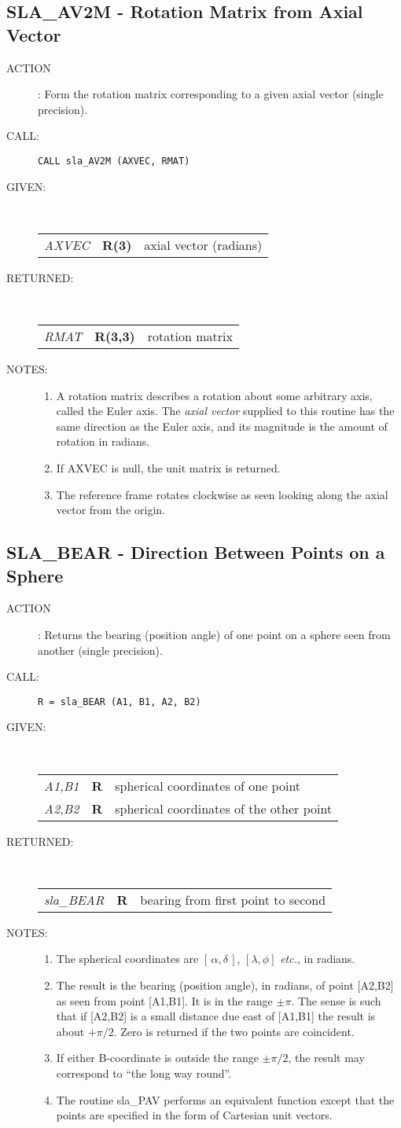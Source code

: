 \documentclass[11pt,twoside]{article}
\newcommand{\xlabel}[1]{}
\newcommand{\radec}     {$[\,\alpha,\delta\,]$}
\newcommand{\routine}[3]
{\hbadness=10000
  \vbox
  {
    \rule{\textwidth}{0.3mm}\\
    {\Large {\bf #1} \hfill #2 \hfill {\bf #1}}\\
    \setlength{\oldspacing}{\topsep}
    \setlength{\topsep}{0.3ex}
    \begin{description}
      #3
    \end{description}
    \setlength{\topsep}{\oldspacing}
  }
}
\renewcommand{\routine}[3]
   {
      \subsection{#1\xlabel{#1} - #2\label{#1}}
       \begin{description}
         #3
       \end{description}
   }
\newcommand{\action}[1]
{\item[ACTION]: #1}
\newcommand{\action}[1]
   {\item[ACTION:] #1}
\newcommand{\call}[1]
{\item[CALL]: \hspace{0.4em}{\tt #1}}
\newlength{\oldspacing}
\renewcommand{\call}[1]
   {
    \item[CALL:] {\tt #1}
   }
\newcommand{\args}[2]
{
  \goodbreak
  \setlength{\oldspacing}{\topsep}
  \setlength{\topsep}{0.3ex}
  \begin{description}
  \item[#1]:\\[1.5ex]
    \begin{tabular}{p{7em}p{6em}p{22em}}
      #2
    \end{tabular}
  \end{description}
  \setlength{\topsep}{\oldspacing}
}
\renewcommand{\args}[2]
   {
     \begin{description}
        \item[#1:]\\
        \begin{tabular}{p{7em}p{6em}l}
           #2
        \end{tabular}
     \end{description}
   }
\newcommand{\spec}[3]
{
  {\em {#1}} & {\bf \mbox{#2}} & {#3}
}
\newcommand{\notes}[1]
{
  \goodbreak
  \setlength{\oldspacing}{\topsep}
  \setlength{\topsep}{0.3ex}
  \begin{description}
    \item[NOTES]:
        #1
  \end{description}
  \setlength{\topsep}{\oldspacing}
}
\renewcommand{\notes}[1]
   {
      \begin{description}
         \item[NOTES:]
            #1
      \end{description}
   }
\begin{document}
\routine{SLA\_AV2M}{Rotation Matrix from Axial Vector}
{
 \action{Form the rotation matrix corresponding to a given axial vector
         (single precision).}
 \call{CALL sla\_AV2M (AXVEC, RMAT)}
}
\args{GIVEN}
{
 \spec{AXVEC}{R(3)}{axial vector (radians)}
}
\args{RETURNED}
{
 \spec{RMAT}{R(3,3)}{rotation matrix}
}
\notes
{
 \begin{enumerate}
  \item A rotation matrix describes a rotation about some
        arbitrary axis, called the Euler axis.  The
        {\it axial vector} supplied to this routine
        has the same direction as the Euler axis, and its
        magnitude is the amount of rotation in radians.
  \item If AXVEC is null, the unit matrix is returned.
  \item The reference frame rotates clockwise as seen looking along
        the axial vector from the origin.
 \end{enumerate}
}
\routine{SLA\_BEAR}{Direction Between Points on a Sphere}
{
 \action{Returns the bearing (position angle) of one point on a
         sphere seen from another (single precision).}
 \call{R~=~sla\_BEAR (A1, B1, A2, B2)}
}
\args{GIVEN}
{
 \spec{A1,B1}{R}{spherical coordinates of one point} \\
 \spec{A2,B2}{R}{spherical coordinates of the other point}
}
\args{RETURNED}
{
 \spec{sla\_BEAR}{R}{bearing from first point to second}
}
\notes
{
 \begin{enumerate}
 \item The spherical coordinates are \radec,
       $[\lambda,\phi]$ {\it etc.}, in radians.
 \item The result is the bearing (position angle), in radians,
       of point [A2,B2] as seen
       from point [A1,B1].  It is in the range $\pm \pi$.  The sense
       is such that if [A2,B2]
       is a small distance due east of [A1,B1] the result
       is about $+\pi/2$. Zero is returned
       if the two points are coincident.
 \item If either B-coordinate is outside the range $\pm\pi/2$, the
       result may correspond to ``the long way round''.
 \item The routine sla\_PAV performs an equivalent function except
       that the points are specified in the form of Cartesian unit
       vectors.
 \end{enumerate}
}
\end{document}
